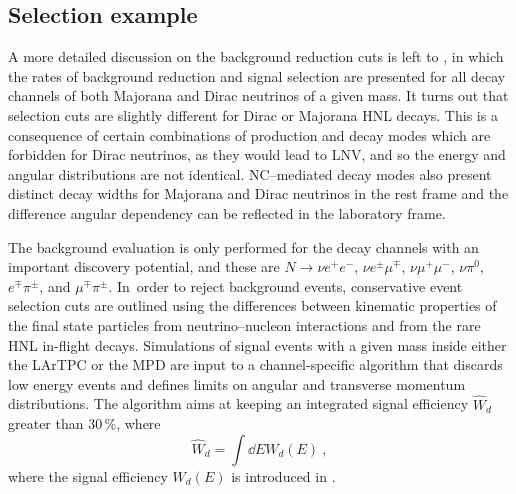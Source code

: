 \subsection{Selection example}
\label{sec:selection}

A more detailed discussion on the background reduction cuts is left to , %
in which the rates of background reduction and signal selection are presented %
for all decay channels of both Majorana and Dirac neutrinos of a given mass.
It turns out that selection cuts are slightly different for Dirac or Majorana HNL decays.
This is a consequence of certain combinations of production and decay modes which are forbidden for Dirac neutrinos, %
as they would lead to LNV, and so the energy and angular distributions are not identical.
NC--mediated decay modes also present distinct decay widths for Majorana and Dirac neutrinos in the rest frame %
and the difference angular dependency can be reflected in the laboratory frame.

The background evaluation is only performed for the decay channels with an important discovery potential, %
and these are $N \to \nu e^+ e^-$, $\nu e^\pm \mu^\mp$, $\nu \mu^+\mu^-$, $\nu\pi^0$, $e^\mp\pi^\pm$, and $\mu^\mp\pi^\pm$. 
In~order to reject background events, conservative event selection cuts are outlined using the differences %
between kinematic properties of the final state particles from neutrino--nucleon interactions and %
from the rare HNL in-flight decays.
Simulations of signal events with a given mass inside either the LArTPC or the MPD are input to a %
channel-specific algorithm that discards low energy events and %
defines limits on angular and transverse momentum distributions.
The algorithm aims at keeping an integrated signal efficiency $\widehat{W}_d$ greater than 30\,\%, where 
\begin{equation}
    \widehat{W}_d = \int \dd{E} W_d(E)\ ,
\end{equation}
where the signal efficiency $W_d(E)$ is introduced in .

